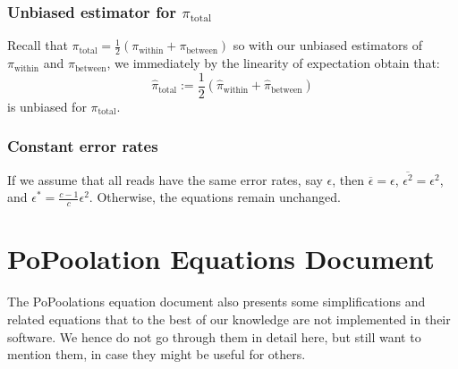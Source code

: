 \documentclass[letterpaper,fontsize=9pt,DIV=12]{scrartcl}
\newcounter{todo}
\newcommand\todo[1]{}
\newcommand*{\piw}{$\pi_\text{within}$\xspace}
\def\mathpiw{\pi_\text{within}}
\newcommand*{\pib}{$\pi_\text{between}$\xspace}
\def\mathpib{\pi_\text{between}}
\newcommand*{\pit}{$\pi_\text{total}$\xspace}
\def\mathpit{\pi_\text{total}}
\begin{document}

\subsubsection*{Unbiased estimator for \pit}
\label{supp:sec:FST:sub:HeterozygositySequencingError:sub:UnbiasedPIT}

Recall that $\mathpit = \frac{1}{2}\left(\mathpiw + \mathpib\right)$ so with our unbiased estimators of \piw and \pib, we immediately by the linearity of expectation obtain that:
\[
\widehat{\pi}_\text{total} := \frac{1}{2}\left(\widehat{\pi}_\text{within} + \widehat{\pi}_\text{between}\right)
\]
is unbiased for \pit.


\subsubsection*{Constant error rates}
\label{supp:sec:FST:sub:HeterozygositySequencingError:sub:ConstErr}

If we assume that all reads have the same error rates, say $\epsilon$, then $\overline{\epsilon} = \epsilon$, $\overline{\epsilon^2} = \epsilon^2$, and $\epsilon^* = \frac{c-1}{c}\epsilon^2$.  Otherwise, the equations remain unchanged.



\section{PoPoolation Equations Document}
\label{supp:sec:PoPoolation2Equations}

The PoPoolations equation document also presents some simplifications and related equations that to the best of our knowledge are not implemented in their software.
We hence do not go through them in detail here, but still want to mention them, in case they might be useful for others.
\end{document}
